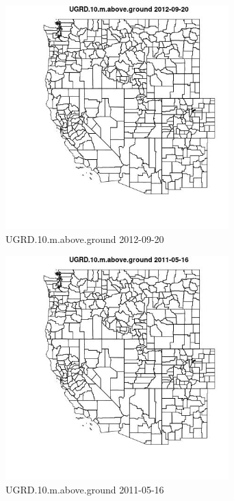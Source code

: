 \begin{figure} 
\centering  
\includegraphics[width=0.77\textwidth]{Code_Outputs/ML_input_report_ML_input_PM25_Step5_part_d_de_duplicated_aves_ML_input_MapObsUGRD10maboveground2012-09-20.jpg} 
\caption{\label{fig:ML_input_report_ML_input_PM25_Step5_part_d_de_duplicated_aves_ML_inputMapObsUGRD10maboveground2012-09-20}UGRD.10.m.above.ground 2012-09-20} 
\end{figure} 
 

\begin{figure} 
\centering  
\includegraphics[width=0.77\textwidth]{Code_Outputs/ML_input_report_ML_input_PM25_Step5_part_d_de_duplicated_aves_ML_input_MapObsUGRD10maboveground2011-05-16.jpg} 
\caption{\label{fig:ML_input_report_ML_input_PM25_Step5_part_d_de_duplicated_aves_ML_inputMapObsUGRD10maboveground2011-05-16}UGRD.10.m.above.ground 2011-05-16} 
\end{figure} 
 

